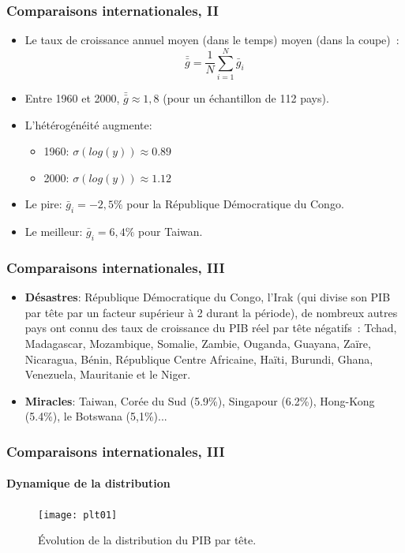 \documentclass[10pt]{beamer}
\begin{document}
\begin{frame}
  \frametitle{Comparaisons internationales, II}

\bigskip

  \begin{itemize}

  \item Le taux de croissance annuel moyen (dans le temps) moyen (dans la coupe) :
    \[
    \bar{\bar g} = \frac{1}{N}\sum_{i=1}^{N} \bar g_{i}
    \]

  \item Entre 1960 et 2000, $\bar{\bar g} \approx 1,8$ (pour un échantillon de 112 pays).\newline

  \item L'hétérogénéité augmente:
    \begin{itemize}
    \item 1960: $\sigma (log(y)) \approx 0.89$
    \item 2000: $\sigma (log(y)) \approx 1.12$
    \end{itemize}

\bigskip

  \item Le pire: $\bar g_{i} = -2,5\%$ pour la République Démocratique du Congo.\newline

  \item Le meilleur: $\bar g_{i} = 6,4\%$ pour Taiwan.\newline

  \end{itemize}

\end{frame}


\begin{frame}
  \frametitle{Comparaisons internationales, III}

\bigskip

  \begin{itemize}

  \item \textbf{Désastres}: République Démocratique du Congo, l'Irak (qui
    divise son PIB par tête par un facteur supérieur à 2 durant la
    période), de nombreux autres pays ont connu des taux de croissance
    du PIB réel par tête négatifs : Tchad, Madagascar, Mozambique,
    Somalie, Zambie, Ouganda, Guayana, Zaïre, Nicaragua, Bénin,
    République Centre Africaine, Haïti, Burundi, Ghana, Venezuela,
    Mauritanie et le Niger.\newline

  \item \textbf{Miracles}: Taiwan, Corée du Sud (5.9\%), Singapour
    (6.2\%), Hong-Kong (5.4\%), le Botswana (5,1\%)...\newline


  \end{itemize}

\end{frame}

\begin{frame}
  \frametitle{Comparaisons internationales, III}
  \framesubtitle{Dynamique de la distribution}


  \bigskip

  \begin{figure}[H]
    \centering
    \texttt{[image: plt01]}
    \caption{Évolution de la distribution du PIB par tête.}
    \label{fig:quah}
  \end{figure}


\end{frame}
\end{document}
